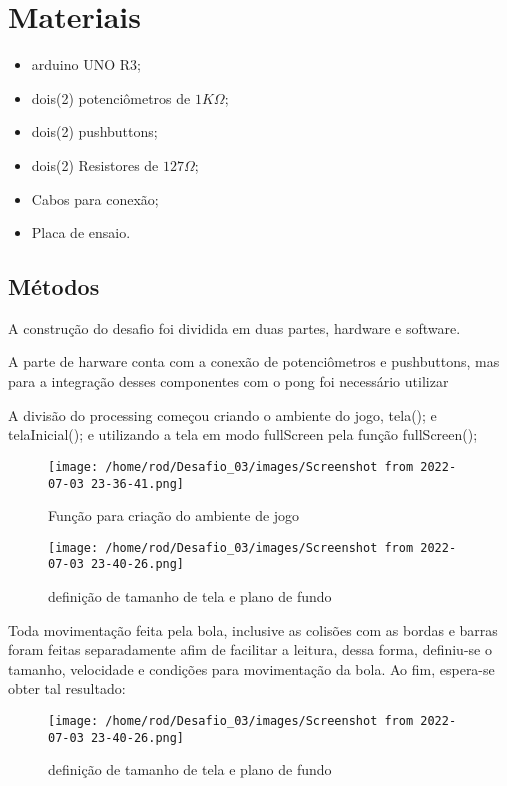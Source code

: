 \documentclass[conference]{IEEEtran}
\begin{document}
\section{Materiais}
 \begin{itemize}
     \item arduino UNO R3;
     \item dois(2) potenciômetros de $ 1K\Omega $;
     \item dois(2) pushbuttons;
     \item dois(2) Resistores de $ 127\Omega $;
     \item Cabos para conexão;
     \item Placa de ensaio.
 \end{itemize}

\subsection{Métodos}
A construção do desafio foi dividida em duas partes, hardware e software. 

A parte de harware conta com a conexão de potenciômetros e pushbuttons, mas para a integração desses componentes com o pong
foi necessário utilizar 

A divisão do processing começou criando o ambiente do jogo, tela(); e telaInicial(); e utilizando a tela em modo fullScreen
pela função fullScreen();


 \begin{figure}[htbp]
    \centerline{\texttt{[image: /home/rod/Desafio\_03/images/Screenshot from 2022-07-03 23-36-41.png]}}
    \caption{Função para criação do ambiente de jogo}
    \label{fig}
    \end{figure}

    \begin{figure}[htbp]
        \centerline{\texttt{[image: /home/rod/Desafio\_03/images/Screenshot from 2022-07-03 23-40-26.png]}}
        \caption{definição de tamanho de tela e plano de fundo}
        \label{fig}
        \end{figure}

Toda movimentação feita pela bola, inclusive as colisões com as bordas e barras foram feitas separadamente afim de 
facilitar a leitura, dessa forma, definiu-se o tamanho, velocidade e condições para movimentação da bola. Ao fim, 
espera-se obter tal resultado:

\begin{figure}[htbp]
    \centerline{\texttt{[image: /home/rod/Desafio\_03/images/Screenshot from 2022-07-03 23-40-26.png]}}
    \caption{definição de tamanho de tela e plano de fundo}
    \label{fig}
    \end{figure}
\end{document}
